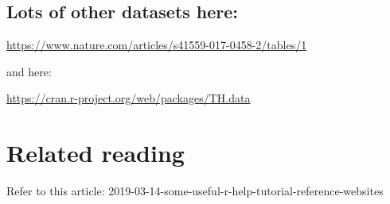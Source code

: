 \documentclass[]{book}
\begin{document}
\hypertarget{lots-of-other-datasets-here}{%
\subsection{Lots of other datasets here:}\label{lots-of-other-datasets-here}}

\url{https://www.nature.com/articles/s41559-017-0458-2/tables/1}

and here:

\url{https://cran.r-project.org/web/packages/TH.data}

\hypertarget{related-books}{%
\section{Related reading}\label{related-books}}

Refer to this article: 2019-03-14-some-useful-r-help-tutorial-reference-websites
\end{document}
